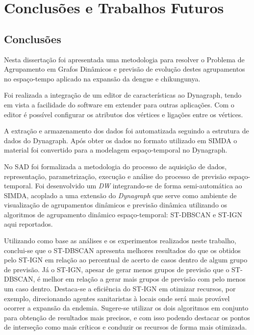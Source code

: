 \chapter{Conclusões e Trabalhos Futuros}
\label{chap:conclusoes-e-trabalhos-futuros}

\section{Conclusões}
\label{sec:conclusoes}

Nesta dissertação foi apresentada uma metodologia para resolver o Problema de Agrupamento em Grafos Dinâmicos e previsão de evolução destes agrupamentos no espaço-tempo aplicado na expansão da dengue e chikungunya.

Foi realizada a integração de um editor de características ao Dynagraph, tendo em vista a facilidade do software em extender para outras aplicações. Com o editor é possível configurar os atributos dos vértices e ligações entre os vértices.

A extração e armazenamento dos dados foi automatizada seguindo a estrutura de dados do Dynagraph. Após obter os dados no formato utilizado em \acrshort{SIMDA} o material foi convertido para a modelagem espaço-temporal no Dynagraph.

No \acrfull{SAD} foi formalizada a metodologia do processo de aquisição de dados, representação, parametrização, execução e análise do processo de previsão espaço-temporal. Foi desenvolvido um \textit{\acrfull{DW}} integrando-se de forma semi-automática ao \acrshort{SIMDA}, acoplado a uma extensão do \emph{Dynagraph} que serve como ambiente de visualização de agrupamentos dinâmicos e previsão dinâmica utilizando os algoritmos de agrupamento dinâmico espaço-temporal: \acrshort{ST-DBSCAN} e \acrshort{ST-IGN} aqui reportados. 

Utilizando como base as análises e os experimentos realizados neste trabalho, conclui-se que o \acrshort{ST-DBSCAN} apresenta melhores resultados do que os obtidos pelo \acrshort{ST-IGN} em relação ao percentual de acerto de casos dentro de algum grupo de previsão. Já o \acrshort{ST-IGN}, apesar de gerar menos grupos de previsão que o \acrshort{ST-DBSCAN}, é melhor em relação a gerar mais grupos de previsão com pelo menos um caso dentro. Destaca-se a eficiência do \acrshort{ST-IGN} em otimizar recursos, por exemplo, direcionando agentes sanitaristas à locais onde será mais provável ocorrer a expansão da endemia.
Sugere-se utilizar os dois algoritmos em conjunto para obtenção de resultados mais precisos, e com isso podendo destacar os pontos de interseção como mais críticos e conduzir os recursos de forma mais otimizada.

